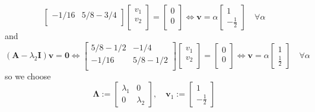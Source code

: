 \documentclass[12pt,a4paper]{article}
\begin{document}
\begin{itemize}
\begin{itemize}
\begin{equation}
\begin{bmatrix}
        -1/16 & 5/8 - 3/4 \\
      \end{bmatrix}
      \begin{bmatrix}
        v_{1} \\
        v_{2} \\
      \end{bmatrix}
      =
      \begin{bmatrix}
        0 \\
        0 \\
      \end{bmatrix}
      \iff
      \bm{v} = \alpha
      \begin{bmatrix}
        1 \\
        -\frac{1}{2}
      \end{bmatrix}
      \quad \forall \alpha
    \end{equation}
    and
    \begin{equation}\nonumber%
      (\bm{A}-\lambda_{2}\bm{I})\bm{v}
      = \bm{0}
      \iff
      \begin{bmatrix}
        5/8 - 1/2 & - 1/4 \\
        -1/16 & 5/8 - 1/2 \\
      \end{bmatrix}
      \begin{bmatrix}
        v_{1} \\
        v_{2} \\
      \end{bmatrix}
      =
      \begin{bmatrix}
        0 \\
        0 \\
      \end{bmatrix}
      \iff
      \bm{v} = \alpha
      \begin{bmatrix}
        1 \\
        \frac{1}{2}
      \end{bmatrix}
      \quad \forall \alpha
    \end{equation}
    so we choose
    \begin{equation}\nonumber%
      \bm{\Lambda}:=
      \begin{bmatrix}
       \lambda_{1} & 0\\
       0 & \lambda_{2}
      \end{bmatrix},
      \quad
      \bm{v}_{1} :=
      \begin{bmatrix}
        1 \\
        - \frac{1}{2}

\end{bmatrix}
\end{equation}
\end{itemize}
\end{itemize}
\end{document}
